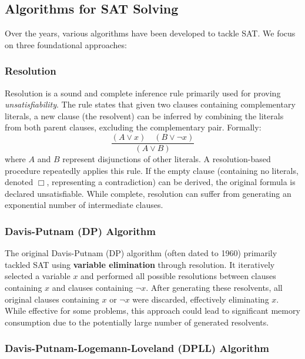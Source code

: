 \documentclass[12pt, a4paper]{article}
\begin{document}
\subsection{Algorithms for SAT Solving}
\label{subsec:algorithms}

Over the years, various algorithms have been developed to tackle SAT. We focus on three foundational approaches:

\subsubsection{Resolution}
\label{subsubsec:resolution}

Resolution is a sound and complete inference rule primarily used for proving \emph{unsatisfiability}. The rule states that given two clauses containing complementary literals, a new clause (the resolvent) can be inferred by combining the literals from both parent clauses, excluding the complementary pair. Formally:
\[
\frac{(A \lor x) \quad (B \lor \lnot x)}{(A \lor B)}
\]
where $A$ and $B$ represent disjunctions of other literals. A resolution-based procedure repeatedly applies this rule. If the empty clause (containing no literals, denoted $\Box$, representing a contradiction) can be derived, the original formula is declared unsatisfiable. While complete, resolution can suffer from generating an exponential number of intermediate clauses.

\subsubsection{Davis-Putnam (DP) Algorithm}
\label{subsubsec:dp}

The original Davis-Putnam (DP) algorithm (often dated to 1960) primarily tackled SAT using \textbf {variable elimination} through resolution. It iteratively selected a variable $x$ and performed all possible resolutions between clauses containing $x$ and clauses containing $\lnot x$. After generating these resolvents, all original clauses containing $x$ or $\lnot x$ were discarded, effectively eliminating $x$. While effective for some problems, this approach could lead to significant memory consumption due to the potentially large number of generated resolvents.

\subsubsection{Davis-Putnam-Logemann-Loveland (DPLL) Algorithm}
\label{subsubsec:dpll}
\end{document}

